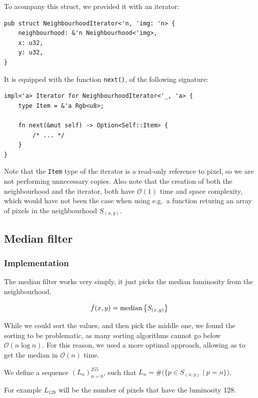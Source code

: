 \documentclass[12pt]{article}
\begin{document}
To acompany this struct, we provided it with an iterator:

\begin{lstlisting}
pub struct NeighbourhoodIterator<'n, 'img: 'n> {
    neighbourhood: &'n Neighbourhood<'img>,
    x: u32,
    y: u32,
}
\end{lstlisting}

It is equipped with the function \lstinline{next()}, of the following signature:

\begin{lstlisting}
impl<'a> Iterator for NeighbourhoodIterator<'_, 'a> {
    type Item = &'a Rgb<u8>;

    fn next(&mut self) -> Option<Self::Item> {
        /* ... */
    }
}
\end{lstlisting}

Note that the \lstinline{Item} type of the iterator is a read-only reference to pixel, so we are not performing unnecessary copies.
Also note that the creation of both the neighbourhood and the iterator, both have $\mathcal{O}(1)$ time and space complexity,
which would have not been the case when using e.g.\ a function returing an array of pixels in the neighbourhood $S_{(x,y)}$.

\subsection{Median filter}

\subsubsection{Implementation}\label{sec:median-impl}

The median filter works very simply, it just picks the median luminosity from the neighbourhood.

\begin{equation}
    \hat{f}(x,y) = \operatorname*{median} \big\{ S_{(x,y)} \big\}
\end{equation}

While we could sort the values, and then pick the middle one,
we found the sorting to be problematic, as many sorting algorithms cannot go below $\mathcal{O}(n \log n)$.
For this reason, we used a more optimal approach, allowing as to get the median in $\mathcal{O}(n)$ time.

We define a sequence $(L_n)_{n=0}^{255}$, such that $L_n = \#\big(\{p \in S_{(x,y)} \mid p = n\}\big)$.

For example $L_{128}$ will be the number of pixels that have the luminosity 128.
\end{document}

